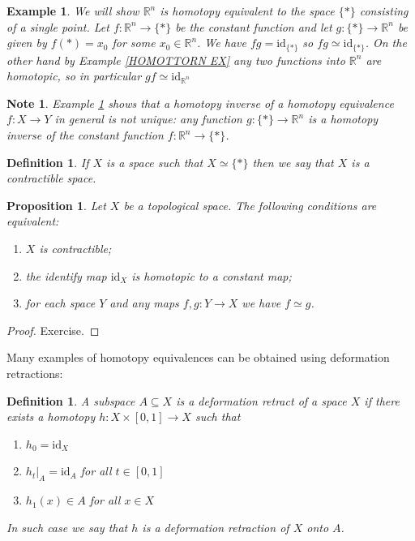 \documentclass[11pt, letterpaper, oneside]{report}
\theoremstyle{pplain}
\newtheorem{proposition}[theorem]{Proposition}
\theoremstyle{ddefinition}
\newtheorem{definition}[theorem]{Definition}
\newtheorem{example}[theorem]{Example}
\newtheorem{note}[theorem]{Note}
\theoremstyle{nnn}
\theoremstyle{eexercise}
\newcommand{\R}{{\mathbb R}}
\newcommand{\id}{\mathrm{id}}
\newcommand{\benu}{\begin{enumerate}}
\newcommand{\eenu}{\end{enumerate}}
\begin{document}
\begin{example}
\label{RN CONTRACTIBLE EX}
We will show $\R^{n}$ is homotopy equivalent to the space $\{\ast\}$ consisting of a single point. 
Let $f\colon \R^{n} \to \{\ast\}$ be the constant function and let $g\colon \{\ast\} \to \R^{n}$ be given by 
$f(\ast) = x_{0}$ for some $x_{0}\in \R^{n}$. We have $fg = \id_{\{\ast\}}$ so $fg\simeq \id_{\{\ast\}}$. 
On the other hand by Example \ref{HOMOTTORN EX} any two functions into $\R^{n}$ are homotopic, 
so in particular $gf \simeq \id_{\R^{n}}$
\end{example}

\begin{note}
Example \ref{RN CONTRACTIBLE EX} shows that a homotopy inverse of a homotopy equivalence 
$f\colon X \to Y$ in general is not unique: any function $g\colon \{\ast\} \to \R^{n}$ is a homotopy 
inverse of the constant function $f\colon \R^{n} \to \{\ast\}$. 
\end{note}

\begin{definition}
If $X$ is a space such that $X \simeq \{\ast\}$ then we say that $X$ is a \emph{contractible space}. 
\end{definition}

\begin{proposition}
Let $X$ be a topological space. The following conditions are equivalent:
\benu
\item[1)] $X$ is contractible; 
\item[2)] the identify map $\id_{X}$ is homotopic to a constant map; 
\item[3)] for each  space $Y$ and any maps $f, g\colon Y \to X$ we have $f\simeq g$. 
\eenu
\end{proposition}

\begin{proof}
Exercise. 
\end{proof}

Many examples of homotopy equivalences can be  obtained  using deformation retractions:

\begin{definition}
A subspace $A \subseteq X$ is a \emph{deformation retract} of a space $X$ if there exists a homotopy 
$h\colon X \times [0, 1] \to X$ such that 
\benu
\item[1)] $h_{0} = \id_{X}$
\item[2)] $h_{t}|_{A} = \id_{A}$ for all  $t\in [0, 1]$ 
\item[3)] $h_{1}(x)\in A$ for all $x\in X$
\eenu
In such case we say that $h$ is a \emph{deformation retraction}
of $X$ onto $A$. 

\end{definition}  
\end{document}
